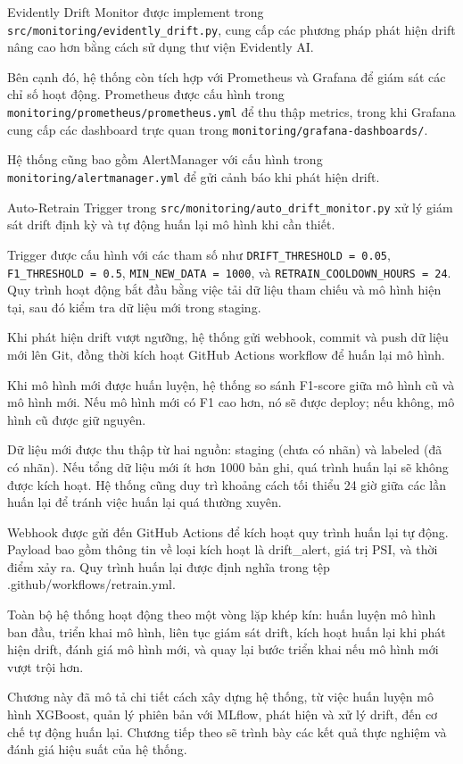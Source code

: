 Evidently Drift Monitor được implement trong \texttt{src/monitoring/evidently\_drift.py}, cung cấp các phương pháp phát hiện drift nâng cao hơn bằng cách sử dụng thư viện Evidently AI.

Bên cạnh đó, hệ thống còn tích hợp với Prometheus và Grafana để giám sát các chỉ số hoạt động. Prometheus được cấu hình trong \texttt{monitoring/prometheus/prometheus.yml} để thu thập metrics, trong khi Grafana cung cấp các dashboard trực quan trong \texttt{monitoring/grafana-dashboards/}.

Hệ thống cũng bao gồm AlertManager với cấu hình trong \texttt{monitoring/alertmanager.yml} để gửi cảnh báo khi phát hiện drift.

Auto-Retrain Trigger trong \texttt{src/monitoring/auto\_drift\_monitor.py} xử lý giám sát drift định kỳ và tự động huấn lại mô hình khi cần thiết.

Trigger được cấu hình với các tham số như \texttt{DRIFT\_THRESHOLD = 0.05}, \texttt{F1\_THRESHOLD = 0.5}, \texttt{MIN\_NEW\_DATA = 1000}, và \texttt{RETRAIN\_COOLDOWN\_HOURS = 24}. Quy trình hoạt động bắt đầu bằng việc tải dữ liệu tham chiếu và mô hình hiện tại, sau đó kiểm tra dữ liệu mới trong staging.

Khi phát hiện drift vượt ngưỡng, hệ thống gửi webhook, commit và push dữ liệu mới lên Git, đồng thời kích hoạt GitHub Actions workflow để huấn lại mô hình.

Khi mô hình mới được huấn luyện, hệ thống so sánh F1-score giữa mô hình cũ và mô hình mới. Nếu mô hình mới có F1 cao hơn, nó sẽ được deploy; nếu không, mô hình cũ được giữ nguyên.

Dữ liệu mới được thu thập từ hai nguồn: staging (chưa có nhãn) và labeled (đã có nhãn). Nếu tổng dữ liệu mới ít hơn 1000 bản ghi, quá trình huấn lại sẽ không được kích hoạt. Hệ thống cũng duy trì khoảng cách tối thiểu 24 giờ giữa các lần huấn lại để tránh việc huấn lại quá thường xuyên.

Webhook được gửi đến GitHub Actions để kích hoạt quy trình huấn lại tự động. Payload bao gồm thông tin về loại kích hoạt là drift\_alert, giá trị PSI, và thời điểm xảy ra. Quy trình huấn lại được định nghĩa trong tệp .github/workflows/retrain.yml.

Toàn bộ hệ thống hoạt động theo một vòng lặp khép kín: huấn luyện mô hình ban đầu, triển khai mô hình, liên tục giám sát drift, kích hoạt huấn lại khi phát hiện drift, đánh giá mô hình mới, và quay lại bước triển khai nếu mô hình mới vượt trội hơn.

Chương này đã mô tả chi tiết cách xây dựng hệ thống, từ việc huấn luyện mô hình XGBoost, quản lý phiên bản với MLflow, phát hiện và xử lý drift, đến cơ chế tự động huấn lại. Chương tiếp theo sẽ trình bày các kết quả thực nghiệm và đánh giá hiệu suất của hệ thống.

